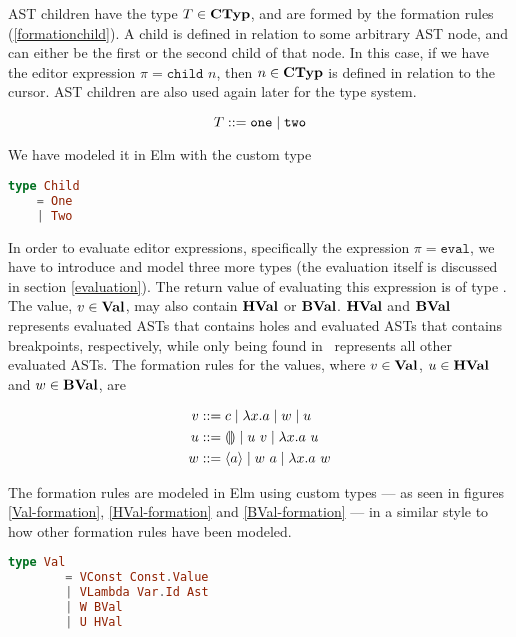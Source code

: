 AST children have the type $T \in \textbf{CTyp}$, and are formed by the formation rules
(\ref{formationchild}). A child is defined in relation to some arbitrary AST
node, and can either be the first or the second child of that node. In this case, if we
have the editor expression $\pi = \texttt{child } n$, then $n \in \textbf{CTyp}$ is
defined in relation to the cursor. AST children are also used again later for the type system.

\begin{equation}\label{formationchild}
    T ::= \texttt{one} \mid \texttt{two}
\end{equation}

We have modeled it in Elm with the custom type

\begin{lstlisting}[language=elm,%
           label={child-formation-elm},%
           gobble=0,%
           caption={Formation rules (\ref{formationchild}) modeled in Elm},%
           ]
type Child
    = One
    | Two
\end{lstlisting}

In order to evaluate editor expressions, specifically the expression $\pi =
    \texttt{eval}$, we have to introduce and model three more types (the evaluation
itself is discussed in section \ref{evaluation}). The return value of evaluating
this expression is of type \val. The value, $v \in \textbf{Val}$, may also contain
$\textbf{HVal}$ or $\textbf{BVal}$. $\textbf{HVal}$ and $\textbf{BVal}$ represents evaluated ASTs that contains
holes and evaluated ASTs that contains breakpoints, respectively, while only
being found in \val~represents all other evaluated ASTs. The formation rules for
the values, where $v \in \textbf{Val}$, $u \in \textbf{HVal}$ and $w \in \textbf{BVal}$, are

\begin{align}
    v &::= c \mid \lambda x.a \mid w \mid u \label{val-formation-rules}   \\
    u &::= \llparenthesis\rrparenthesis \mid u~v \mid \lambda x.a~u \label{hval-formation-rules} \\
    w &::= \langle a \rangle \mid w~a \mid \lambda x.a~w \label{bval-formation-rules}
\end{align}

The formation rules are modeled in Elm using custom types --- as seen in
figures \ref{Val-formation}, \ref{HVal-formation} and \ref{BVal-formation} ---
in a similar style to how other formation rules have been modeled.

\begin{lstlisting}[language=elm,%
                     label={Val-formation},%
                     gobble=6,%
                     caption={Formation rules (\ref{val-formation-rules}) modeled in Elm},%
                     ]
      type Val
        = VConst Const.Value
        | VLambda Var.Id Ast
        | W BVal
        | U HVal
\end{lstlisting}

